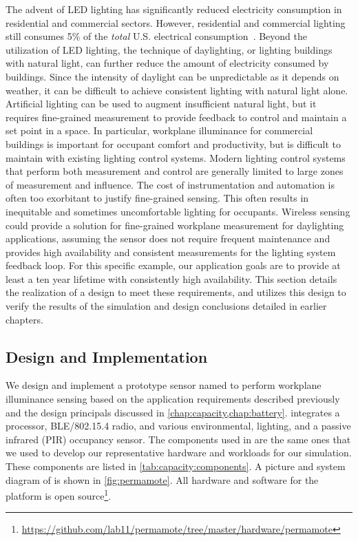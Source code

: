 The advent of LED lighting has significantly reduced electricity consumption in residential and commercial sectors. However, residential and commercial lighting still consumes 5\% of the \textit{total} U.S. electrical consumption~\cite{aeo2022}.
Beyond the utilization of LED lighting, the technique of daylighting, or lighting buildings with natural light, can further reduce the amount of electricity consumed by buildings. 
Since the intensity of daylight can be unpredictable as it depends on weather, it can be difficult to achieve consistent lighting with natural light alone.
Artificial lighting can be used to augment insufficient natural light, but it requires fine-grained measurement to provide feedback to control and maintain a set point in a space.
In particular, workplane illuminance for commercial buildings is important for occupant comfort and productivity, but is difficult to maintain with existing lighting control systems. 
Modern lighting control systems that perform both measurement and control are generally limited to large zones of measurement and influence. 
The cost of instrumentation and automation is often too exorbitant to justify fine-grained sensing.
This often results in inequitable and sometimes uncomfortable lighting for occupants.
Wireless sensing could provide a solution for fine-grained workplane measurement for daylighting applications, assuming the sensor does not require frequent maintenance and provides high availability and consistent measurements for the lighting system feedback loop.
For this specific example, our application goals are to provide at least a ten year lifetime with consistently high availability. 
This section details the realization of a design to meet these requirements, and utilizes this design to verify the results of the simulation and design conclusions detailed in earlier chapters.


\subsection{Design and Implementation}
We design and implement a prototype sensor named \name to perform workplane illuminance sensing based on the application requirements described previously and the design principals discussed in \cref{chap:capacity,chap:battery}.
\name integrates a processor, BLE/802.15.4 radio, and various environmental, lighting,
and a passive infrared (PIR) occupancy sensor.
The components used in \name are the same ones that we used to develop our representative hardware and workloads for our simulation. 
These components are listed in \cref{tab:capacity:components}. 
A picture
and system diagram of \name is shown in \cref{fig:permamote}. All hardware
and software for the platform is open source\footnote{\url{https://github.com/lab11/permamote/tree/master/hardware/permamote}}.

